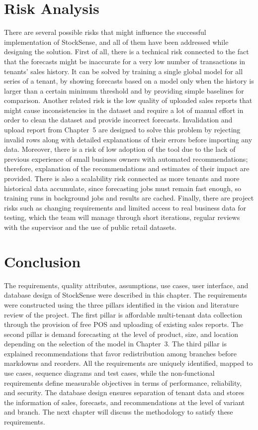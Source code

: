 \documentclass{StockSense}
\begin{document}
\section{Risk Analysis}

There are several possible risks that might influence the successful implementation of StockSense, and all of them have been addressed while designing the solution. First of all, there is a technical risk connected to the fact that the forecasts might be inaccurate for a very low number of transactions in tenants' sales history. It can be solved by training a single global model for all series of a tenant, by showing forecasts based on a model only when the history is larger than a certain minimum threshold and by providing simple baselines for comparison. Another related risk is the low quality of uploaded sales reports that might cause inconsistencies in the dataset and require a lot of manual effort in order to clean the dataset and provide incorrect forecasts. Invalidation and upload report from Chapter~5 are designed to solve this problem by rejecting invalid rows along with detailed explanations of their errors before importing any data. Moreover, there is a risk of low adoption of the tool due to the lack of previous experience of small business owners with automated recommendations; therefore, explanation of the recommendations and estimates of their impact are provided. There is also a scalability risk connected as more tenants and more historical data accumulate, since forecasting jobs must remain fast enough, so training runs in background jobs and results are cached. Finally, there are project risks such as changing requirements and limited access to real business data for testing, which the team will manage through short iterations, regular reviews with the supervisor and the use of public retail datasets.

\section{Conclusion}

The requirements, quality attributes, assumptions, use cases, user interface, and database design of StockSense were described in this chapter. The requirements were constructed using the three pillars identified in the vision and literature review of the project. The first pillar is affordable multi-tenant data collection through the provision of free POS and uploading of existing sales reports. The second pillar is demand forecasting at the level of product, size, and location depending on the selection of the model in Chapter~3. The third pillar is explained recommendations that favor redistribution among branches before markdowns and reorders. All the requirements are uniquely identified, mapped to use cases, sequence diagrams and test cases, while the non-functional requirements define measurable objectives in terms of performance, reliability, and security. The database design ensures separation of tenant data and stores the information of sales, forecasts, and recommendations at the level of variant and branch. The next chapter will discuss the methodology to satisfy these requirements.
\end{document}
